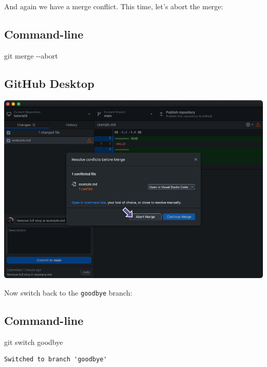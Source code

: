 \documentclass[
  letterpaper,
  DIV=11,
  numbers=noendperiod]{scrartcl}
\newenvironment{Shaded}{\begin{snugshade}}{\end{snugshade}}
\newcommand{\AttributeTok}[1]{\textcolor[rgb]{0.40,0.45,0.13}{#1}}
\newcommand{\FunctionTok}[1]{\textcolor[rgb]{0.28,0.35,0.67}{#1}}
\newcommand{\NormalTok}[1]{\textcolor[rgb]{0.00,0.23,0.31}{#1}}
\begin{document}
And again we have a merge conflict. This time, let's abort the merge:

\subsection{Command-line}

\begin{Shaded}
\begin{Highlighting}[]
\FunctionTok{git}\NormalTok{ merge }\AttributeTok{{-}{-}abort}
\end{Highlighting}
\end{Shaded}

\subsection{GitHub Desktop}

\includegraphics{images/image64.png}

Now switch back to the \texttt{goodbye} branch:

\subsection{Command-line}

\begin{Shaded}
\begin{Highlighting}[]
\FunctionTok{git}\NormalTok{ switch goodbye}
\end{Highlighting}
\end{Shaded}

\begin{verbatim}
Switched to branch 'goodbye'
\end{verbatim}
\end{document}
